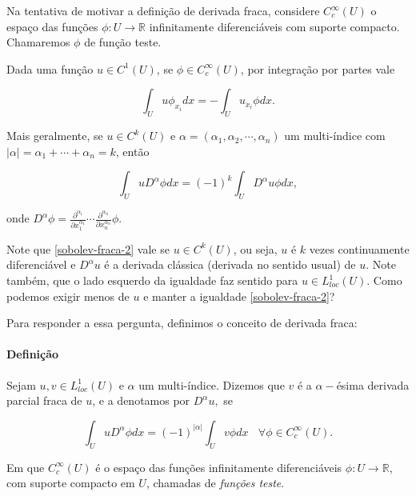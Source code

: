 \documentclass[a4paper, 11pt]{book}
\newcommand{\R}{\mathbb{R}}
\begin{document}
Na tentativa de motivar a definição de derivada fraca, considere $C^{\infty}_c (U)$ o espaço das funções $ \phi :U \longrightarrow \mathbb{R}$ infinitamente diferenciáveis com suporte compacto. Chamaremos $\phi$ de função teste.

Dada uma função $u \in C^1(U)$, se $\phi \in C^{\infty}_c (U)$, por integração por partes vale

\begin{equation}
	\int_{U} u \phi_{x_i} dx = - \int_{U} u_{x_i} \phi dx.
\end{equation}

Mais geralmente, se $u \in C^k(U)$ e $\alpha=(\alpha_1, \alpha_2, \cdots, \alpha_n)$ um multi-índice com $|\alpha|= \alpha_1 + \cdots +\alpha_n= k$, então

\begin{equation}\label{sobolev-fraca-2}
\int_{U} u D^{\alpha}\phi dx = (-1)^k \int_{U} D^{\alpha}u \phi dx,
\end{equation}

onde $D^{\alpha} \phi= \frac{\partial ^{\alpha_1}}{\partial x_1^{\alpha_1}}\cdots \frac{\partial ^{\alpha_n}}{\partial x_n^{\alpha_n}}\phi$.

Note que \eqref{sobolev-fraca-2} vale se $u \in C^k(U)$, ou seja, $u$ é $k$ vezes continuamente diferenciável e $D^{\alpha}u$ é a derivada clássica (derivada no sentido usual) de $u$. Note também, que o lado esquerdo  da igualdade faz sentido para $u \in L^1_{loc}(U)$. Como podemos exigir menos de $u$ e manter a igualdade \eqref{sobolev-fraca-2}?

Para responder a essa pergunta, definimos o conceito de derivada fraca:

\paragraph{Definição} Sejam $u,v \in L^1_{loc}(U)$ e $\alpha$ um multi-índice. Dizemos que $v$ é a $\alpha-$ésima derivada parcial fraca de $u$, e a denotamos por $D^{\alpha}u,$ se 

\begin{equation}\label{derivadafraca}
   \int_{U} u D^{\alpha}\phi dx = (-1)^{|\alpha|} \int_{U} v \phi dx  \ \ \ \ \forall \phi \in C^{\infty}_c(U).
   \end{equation}

Em que \( C^{\infty}_c (U) \) é o espaço das funções infinitamente diferenciáveis \( \phi:U\rightarrow \R \), com suporte compacto em \( U \), chamadas de \textit{funções teste}. 
\end{document}
